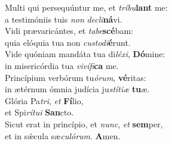 \oddverse Multi qui persequúntur me, et \textit{trí}\textit{bu}\textbf{lant} me:~\*\\
\oddverse a testimóniis tuis \textit{non} \textit{de}\textit{cli}\textbf{ná}vi.\\
\evenverse Vidi prævaricántes, et \textit{ta}\textit{be}\textbf{scé}bam:~\*\\
\evenverse quia elóquia tua non \textit{cu}\textit{sto}\textit{di}\textbf{é}runt.\\
\oddverse Vide quóniam mandáta tua di\textit{lé}\textit{xi}, \textbf{Dó}mine:~\*\\
\oddverse in misericórdia tua \textit{vi}\textit{ví}\textit{fi}\textbf{ca} me.\\
\evenverse Princípium verbórum tu\textit{ó}\textit{rum}, \textbf{vé}ritas:~\*\\
\evenverse in ætérnum ómnia judícia ju\textit{stí}\textit{ti}\textit{æ} \textbf{tu}æ.\\
\oddverse Glória Pa\textit{tri}, \textit{et} \textbf{Fí}lio,~\*\\
\oddverse et Spi\textit{rí}\textit{tu}\textit{i} \textbf{San}cto.\\
\evenverse Sicut erat in princípio, et \textit{nunc}, \textit{et} \textbf{sem}per,~\*\\
\evenverse et in sǽcula sæ\textit{cu}\textit{ló}\textit{rum}. \textbf{A}men.\\
